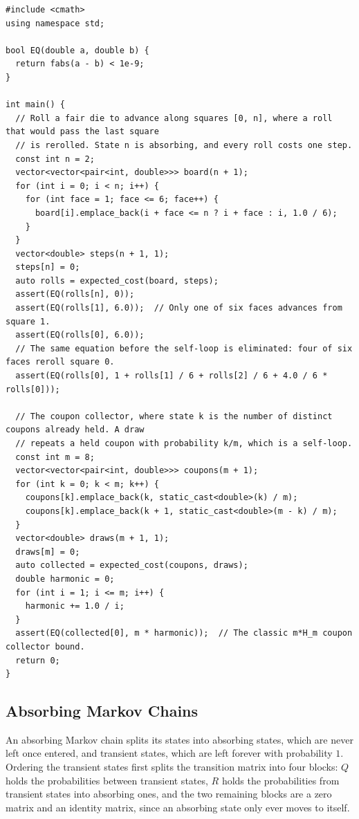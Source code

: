 \begin{lstlisting}[style=cpp]
#include <cmath>
using namespace std;

bool EQ(double a, double b) {
  return fabs(a - b) < 1e-9;
}

int main() {
  // Roll a fair die to advance along squares [0, n], where a roll that would pass the last square
  // is rerolled. State n is absorbing, and every roll costs one step.
  const int n = 2;
  vector<vector<pair<int, double>>> board(n + 1);
  for (int i = 0; i < n; i++) {
    for (int face = 1; face <= 6; face++) {
      board[i].emplace_back(i + face <= n ? i + face : i, 1.0 / 6);
    }
  }
  vector<double> steps(n + 1, 1);
  steps[n] = 0;
  auto rolls = expected_cost(board, steps);
  assert(EQ(rolls[n], 0));
  assert(EQ(rolls[1], 6.0));  // Only one of six faces advances from square 1.
  assert(EQ(rolls[0], 6.0));
  // The same equation before the self-loop is eliminated: four of six faces reroll square 0.
  assert(EQ(rolls[0], 1 + rolls[1] / 6 + rolls[2] / 6 + 4.0 / 6 * rolls[0]));

  // The coupon collector, where state k is the number of distinct coupons already held. A draw
  // repeats a held coupon with probability k/m, which is a self-loop.
  const int m = 8;
  vector<vector<pair<int, double>>> coupons(m + 1);
  for (int k = 0; k < m; k++) {
    coupons[k].emplace_back(k, static_cast<double>(k) / m);
    coupons[k].emplace_back(k + 1, static_cast<double>(m - k) / m);
  }
  vector<double> draws(m + 1, 1);
  draws[m] = 0;
  auto collected = expected_cost(coupons, draws);
  double harmonic = 0;
  for (int i = 1; i <= m; i++) {
    harmonic += 1.0 / i;
  }
  assert(EQ(collected[0], m * harmonic));  // The classic m*H_m coupon collector bound.
  return 0;
}
\end{lstlisting}
\subsection{Absorbing Markov Chains}
\label{sec:6.7.3}
An absorbing Markov chain splits its states into absorbing states, which are never left once entered, and transient states, which are left forever with probability $1$. Ordering the transient states first splits the transition matrix into four blocks: $Q$ holds the probabilities between transient states, $R$ holds the probabilities from transient states into absorbing ones, and the two remaining blocks are a zero matrix and an identity matrix, since an absorbing state only ever moves to itself.

